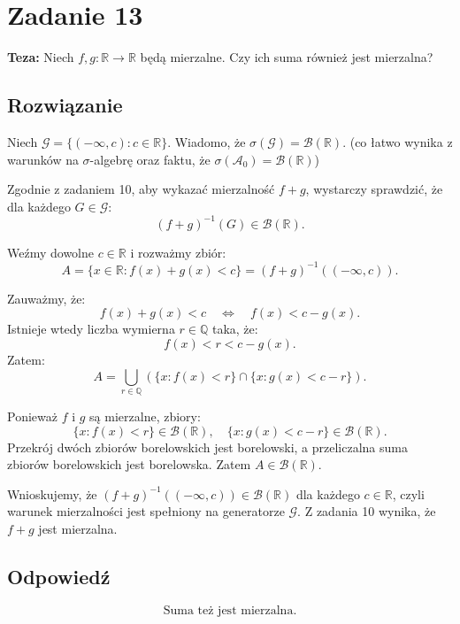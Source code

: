 \section{Zadanie 13}
\textbf{Teza:} Niech \(f, g : \mathbb{R} \to \mathbb{R}\) będą mierzalne. Czy ich suma również jest mierzalna?

\subsection*{Rozwiązanie}


Niech \(\mathcal{G} = \{ (-\infty, c) : c \in \mathbb{R} \}\).
Wiadomo, że \(\sigma(\mathcal{G}) = \mathcal{B}(\mathbb{R})\).
(co łatwo wynika z warunków na \(\sigma\)-algebrę oraz faktu, że \(\sigma(\mathcal{A}_0) = \mathcal{B}(\mathbb{R})\))

Zgodnie z zadaniem 10, aby wykazać mierzalność \(f + g\), wystarczy sprawdzić, że dla każdego \(G \in \mathcal{G}\):
\[
	(f + g)^{-1}(G) \in \mathcal{B}(\mathbb{R}).
\]

Weźmy dowolne \(c \in \mathbb{R}\) i rozważmy zbiór:
\[
	A = \{ x \in \mathbb{R} : f(x) + g(x) < c \} = (f + g)^{-1}((-\infty, c)).
\]

Zauważmy, że:
\[
	f(x) + g(x) < c \quad \iff \quad f(x) < c - g(x).
\]
Istnieje wtedy liczba wymierna \(r \in \mathbb{Q}\) taka, że:
\[
	f(x) < r < c - g(x).
\]
Zatem:
\[
	A = \bigcup_{r \in \mathbb{Q}} \left( \{ x : f(x) < r \} \cap \{ x : g(x) < c - r \} \right).
\]

Ponieważ \(f\) i \(g\) są mierzalne, zbiory:
\[
	\{ x : f(x) < r \} \in \mathcal{B}(\mathbb{R}), \quad \{ x : g(x) < c - r \} \in \mathcal{B}(\mathbb{R}).
\]
Przekrój dwóch zbiorów borelowskich jest borelowski, a przeliczalna suma zbiorów borelowskich jest borelowska.
Zatem \(A \in \mathcal{B}(\mathbb{R})\).

Wnioskujemy, że \((f + g)^{-1}((-\infty, c)) \in \mathcal{B}(\mathbb{R})\) dla każdego \(c \in \mathbb{R}\),
czyli warunek mierzalności jest spełniony na generatorze \(\mathcal{G}\).
Z zadania 10 wynika, że \(f + g\) jest mierzalna.


\subsection*{Odpowiedź}
\[
	\boxed{\text{Suma też jest mierzalna.}}
\]

